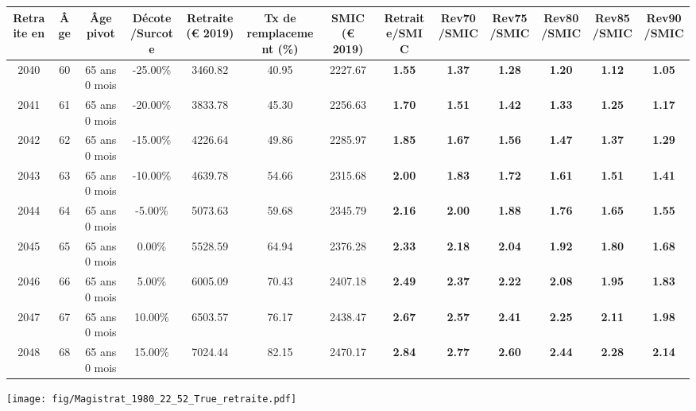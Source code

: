 { \scriptsize \begin{center} 
\begin{tabular}[htb]{|c|c||c|c||c|c||c||c|c|c|c|c|c|} 
\hline 
 Retraite en &  Âge &  Âge pivot &  Décote/Surcote &  Retraite (\euro{} 2019) &  Tx de remplacement (\%) &  SMIC (\euro{} 2019) &  Retraite/SMIC &  Rev70/SMIC &  Rev75/SMIC &  Rev80/SMIC &  Rev85/SMIC &  Rev90/SMIC \\ 
\hline \hline 
 2040 &  60 &  65 ans 0 mois &  -25.00\% &  3460.82 &  40.95 &  2227.67 &  {\bf 1.55} &  {\bf 1.37} &  {\bf 1.28} &  {\bf 1.20} &  {\bf 1.12} &  {\bf 1.05} \\ 
\hline 
 2041 &  61 &  65 ans 0 mois &  -20.00\% &  3833.78 &  45.30 &  2256.63 &  {\bf 1.70} &  {\bf 1.51} &  {\bf 1.42} &  {\bf 1.33} &  {\bf 1.25} &  {\bf 1.17} \\ 
\hline 
 2042 &  62 &  65 ans 0 mois &  -15.00\% &  4226.64 &  49.86 &  2285.97 &  {\bf 1.85} &  {\bf 1.67} &  {\bf 1.56} &  {\bf 1.47} &  {\bf 1.37} &  {\bf 1.29} \\ 
\hline 
 2043 &  63 &  65 ans 0 mois &  -10.00\% &  4639.78 &  54.66 &  2315.68 &  {\bf 2.00} &  {\bf 1.83} &  {\bf 1.72} &  {\bf 1.61} &  {\bf 1.51} &  {\bf 1.41} \\ 
\hline 
 2044 &  64 &  65 ans 0 mois &  -5.00\% &  5073.63 &  59.68 &  2345.79 &  {\bf 2.16} &  {\bf 2.00} &  {\bf 1.88} &  {\bf 1.76} &  {\bf 1.65} &  {\bf 1.55} \\ 
\hline 
 2045 &  65 &  65 ans 0 mois &  0.00\% &  5528.59 &  64.94 &  2376.28 &  {\bf 2.33} &  {\bf 2.18} &  {\bf 2.04} &  {\bf 1.92} &  {\bf 1.80} &  {\bf 1.68} \\ 
\hline 
 2046 &  66 &  65 ans 0 mois &  5.00\% &  6005.09 &  70.43 &  2407.18 &  {\bf 2.49} &  {\bf 2.37} &  {\bf 2.22} &  {\bf 2.08} &  {\bf 1.95} &  {\bf 1.83} \\ 
\hline 
 2047 &  67 &  65 ans 0 mois &  10.00\% &  6503.57 &  76.17 &  2438.47 &  {\bf 2.67} &  {\bf 2.57} &  {\bf 2.41} &  {\bf 2.25} &  {\bf 2.11} &  {\bf 1.98} \\ 
\hline 
 2048 &  68 &  65 ans 0 mois &  15.00\% &  7024.44 &  82.15 &  2470.17 &  {\bf 2.84} &  {\bf 2.77} &  {\bf 2.60} &  {\bf 2.44} &  {\bf 2.28} &  {\bf 2.14} \\ 
\hline 
\hline 
\end{tabular} 
\end{center} } 

 \begin{center}\texttt{[image: fig/Magistrat\_1980\_22\_52\_True\_retraite.pdf]}\end{center} 

